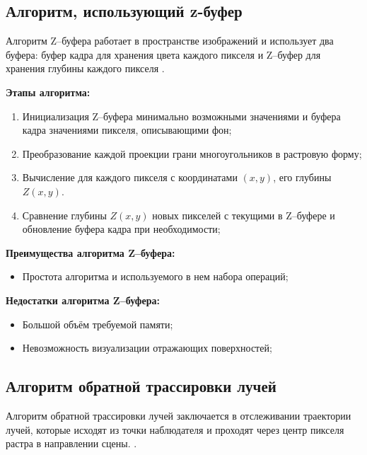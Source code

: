\subsection{Алгоритм, использующий z-буфер}
Алгоритм Z--буфера работает в пространстве изображений и использует два буфера: буфер кадра для хранения цвета каждого
пикселя и Z--буфер для хранения глубины каждого пикселя \cite{shikinStCG}.

\textbf{Этапы алгоритма:}
\begin{enumerate}[label=\arabic*)]
	\item Инициализация Z--буфера минимально возможными значениями и буфера кадра значениями пикселя, описывающими фон;
	\item Преобразование каждой проекции грани многоугольников в растровую форму;
	\item Вычисление для каждого пикселя с координатами $(x, y)$, его глубины $Z(x, y)$.
	\item Сравнение глубины $Z(x, y)$ новых пикселей с текущими в Z--буфере и обновление буфера кадра при необходимости;
\end{enumerate}

\textbf{Преимущества алгоритма Z--буфера:}
\begin{itemize}
	\item Простота алгоритма и используемого в нем набора операций;
\end{itemize}

\textbf{Недостатки алгоритма Z--буфера:}
\begin{itemize}
	\item Большой объём требуемой памяти;
	\item Невозможность визуализации отражающих поверхностей;
\end{itemize}

\subsection{Алгоритм обратной трассировки лучей}
Алгоритм обратной трассировки лучей заключается в отслеживании траектории лучей, которые исходят из точки наблюдателя и проходят через центр пикселя растра в направлении сцены. \cite{shikinDinamica}.

